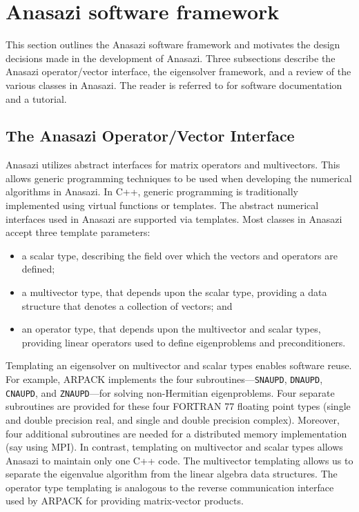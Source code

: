 \documentclass[acmtoms]{acmtrans2m}
\newcounter{algorithm}
\begin{document}
\section{Anasazi software framework}
\label{sec:framework}

This section outlines the Anasazi software framework and motivates
the design decisions made in the development of Anasazi. Three
subsections describe the Anasazi operator/vector interface, the
eigensolver framework, and a review of the various classes in
Anasazi. The reader is referred to
\cite{Trilinos:anasazi,Trilinos-Tutorial} for software documentation
and a tutorial.

\subsection{The Anasazi Operator/Vector Interface}
\label{sec:anasazi:opvec}

Anasazi utilizes abstract interfaces for matrix operators and
multivectors. This allows generic programming techniques to be used
when developing the numerical algorithms in Anasazi. In C++, generic
programming is traditionally implemented using virtual
functions or templates. The abstract numerical interfaces used
in Anasazi are supported via templates. Most classes in Anasazi accept
three template parameters:
\begin{itemize}
\item
a scalar type, describing the field over which the vectors and
operators are defined;
\item
a multivector type, that depends upon the scalar type, providing a
data structure that denotes a collection of vectors; and
\item
an operator type, that depends upon the multivector and scalar types,
providing linear operators used to define eigenproblems and
preconditioners.
\end{itemize}

Templating an eigensolver on multivector and scalar types enables software reuse. For
example, ARPACK implements the four subroutines---\texttt{SNAUPD}, \texttt{DNAUPD},
\texttt{CNAUPD}, and \texttt{ZNAUPD}---for solving non-Hermitian eigenproblems. Four
separate subroutines are provided for these four FORTRAN 77 floating point types (single
and double precision real, and single and double precision complex). Moreover, four
additional subroutines are needed for a distributed memory implementation (say using MPI).
In contrast, templating on multivector and scalar types allows Anasazi to maintain only
one C++ code. The multivector templating allows us to separate the eigenvalue algorithm
from the linear algebra data structures. The operator type templating is analogous to the
reverse communication interface used by ARPACK for providing matrix-vector products.
\end{document}

